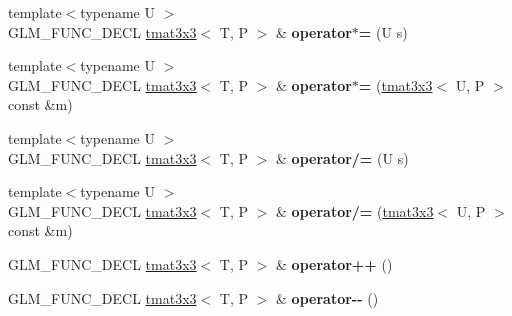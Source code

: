 \begin{DoxyCompactItemize}
\item 
{\footnotesize template$<$typename U $>$ }\\G\+L\+M\+\_\+\+F\+U\+N\+C\+\_\+\+D\+E\+CL \hyperlink{structglm_1_1detail_1_1tmat3x3}{tmat3x3}$<$ T, P $>$ \& {\bfseries operator$\ast$=} (U s)\hypertarget{structglm_1_1detail_1_1tmat3x3_ad720ed5f090b44ffc9de39e217e14778}{}\label{structglm_1_1detail_1_1tmat3x3_ad720ed5f090b44ffc9de39e217e14778}

\item 
{\footnotesize template$<$typename U $>$ }\\G\+L\+M\+\_\+\+F\+U\+N\+C\+\_\+\+D\+E\+CL \hyperlink{structglm_1_1detail_1_1tmat3x3}{tmat3x3}$<$ T, P $>$ \& {\bfseries operator$\ast$=} (\hyperlink{structglm_1_1detail_1_1tmat3x3}{tmat3x3}$<$ U, P $>$ const \&m)\hypertarget{structglm_1_1detail_1_1tmat3x3_a688e29783f988517fec9fb416af1b54e}{}\label{structglm_1_1detail_1_1tmat3x3_a688e29783f988517fec9fb416af1b54e}

\item 
{\footnotesize template$<$typename U $>$ }\\G\+L\+M\+\_\+\+F\+U\+N\+C\+\_\+\+D\+E\+CL \hyperlink{structglm_1_1detail_1_1tmat3x3}{tmat3x3}$<$ T, P $>$ \& {\bfseries operator/=} (U s)\hypertarget{structglm_1_1detail_1_1tmat3x3_afb56c9bce7eef169c698fe459a91c402}{}\label{structglm_1_1detail_1_1tmat3x3_afb56c9bce7eef169c698fe459a91c402}

\item 
{\footnotesize template$<$typename U $>$ }\\G\+L\+M\+\_\+\+F\+U\+N\+C\+\_\+\+D\+E\+CL \hyperlink{structglm_1_1detail_1_1tmat3x3}{tmat3x3}$<$ T, P $>$ \& {\bfseries operator/=} (\hyperlink{structglm_1_1detail_1_1tmat3x3}{tmat3x3}$<$ U, P $>$ const \&m)\hypertarget{structglm_1_1detail_1_1tmat3x3_a78341f4a3d5353411c69f40e0b9b9560}{}\label{structglm_1_1detail_1_1tmat3x3_a78341f4a3d5353411c69f40e0b9b9560}

\item 
G\+L\+M\+\_\+\+F\+U\+N\+C\+\_\+\+D\+E\+CL \hyperlink{structglm_1_1detail_1_1tmat3x3}{tmat3x3}$<$ T, P $>$ \& {\bfseries operator++} ()\hypertarget{structglm_1_1detail_1_1tmat3x3_aba962e910e7a5e3de57b14c4215ec471}{}\label{structglm_1_1detail_1_1tmat3x3_aba962e910e7a5e3de57b14c4215ec471}

\item 
G\+L\+M\+\_\+\+F\+U\+N\+C\+\_\+\+D\+E\+CL \hyperlink{structglm_1_1detail_1_1tmat3x3}{tmat3x3}$<$ T, P $>$ \& {\bfseries operator-\/-\/} ()\hypertarget{structglm_1_1detail_1_1tmat3x3_a00ca964c42c36a5472103aa3a9b375fc}{}\label{structglm_1_1detail_1_1tmat3x3_a00ca964c42c36a5472103aa3a9b375fc}


\end{DoxyCompactItemize}
